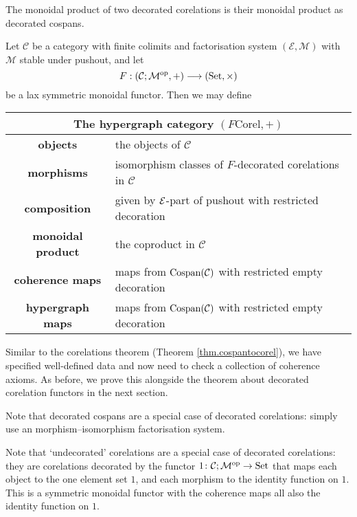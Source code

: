 The monoidal product of two decorated corelations is their monoidal product as
decorated cospans.

\begin{theorem} \label{thm.fcorel}
  Let $\mathcal C$ be a category with finite colimits and factorisation system
  $(\mathcal E, \mathcal M)$ with $\mathcal M$ stable under pushout, and let 
  \[
    F: (\mathcal C;\mathcal M^{\mathrm{op}},+) \longrightarrow (\mathrm{Set}, \times)
  \]
  be a lax symmetric monoidal functor.  Then we may define 
  \begin{center}
    \begin{tabular}{| c | p{} |}
      \hline
      \multicolumn{2}{|c|}{The hypergraph category $(F\mathrm{Corel},+)$} \\
      \hline
      \textbf{objects} & the objects of $\mathcal C$ \\ 
      \textbf{morphisms} & isomorphism classes of $F$-decorated corelations in
      $\mathcal C$\\ 
      \textbf{composition} & given by $\mathcal E$-part of pushout with restricted
      decoration  \\
      \textbf{monoidal product} & the coproduct in $\mathcal C$  \\
      \textbf{coherence maps} & maps from $\operatorname{{Cospan}}(\mathcal C)$ with restricted empty
      decoration \\
      \textbf{hypergraph maps} & maps from $\operatorname{{Cospan}}(\mathcal C)$ with restricted empty
      decoration \\
      \hline
    \end{tabular}
  \end{center}
\end{theorem}
Similar to the corelations theorem (Theorem \ref{thm.cospantocorel}), we have
specified well-defined data and now need to check a collection of coherence
axioms. As before, we prove this alongside the theorem about decorated
corelation functors in the next section.

\begin{example}
  Note that decorated cospans are a special case of decorated corelations:
  simply use an morphism--isomorphism factorisation system.
\end{example}

\begin{example} \label{ex.undeccorel}
  Note that `undecorated' corelations are a special case of decorated
  corelations: they are corelations decorated by the functor $1{\colon} \mathcal C;\mathcal
  M^{\mathrm{op}} \to \mathrm{Set}$ that maps each object to the one element set $1$, and each
  morphism to the identity function on $1$. This is a symmetric monoidal functor
  with the coherence maps all also the identity function on $1$.
\end{example}


